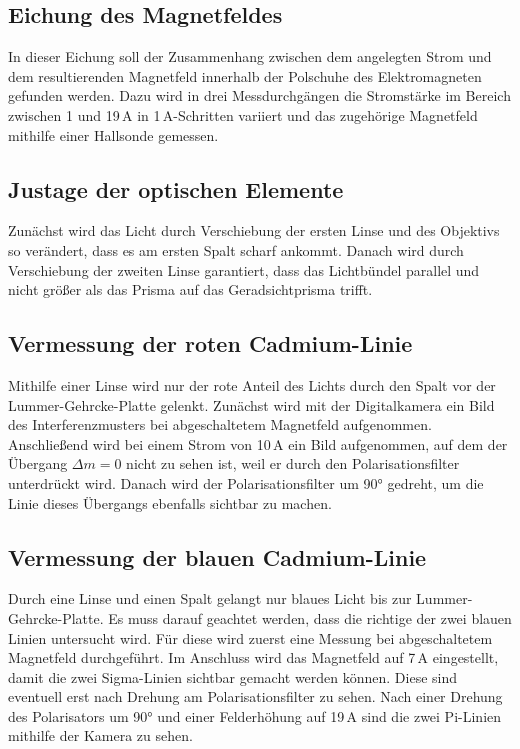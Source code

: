        \subsection{Eichung des Magnetfeldes}

            In dieser Eichung soll der Zusammenhang zwischen dem angelegten Strom und 
            dem resultierenden Magnetfeld innerhalb der Polschuhe des Elektromagneten 
            gefunden werden. Dazu wird in drei Messdurchgängen 
            die Stromstärke im Bereich zwischen 1 und 19\,A in 1\,A-Schritten variiert
            und das zugehörige Magnetfeld mithilfe einer Hallsonde gemessen.

        \subsection{Justage der optischen Elemente}

            Zunächst wird das Licht durch Verschiebung der ersten Linse und des Objektivs 
            so verändert, dass es am ersten Spalt scharf ankommt. Danach wird durch Verschiebung 
            der zweiten Linse garantiert, dass das Lichtbündel parallel und nicht größer als 
            das Prisma auf das Geradsichtprisma trifft.

        \subsection{Vermessung der roten Cadmium-Linie}

            Mithilfe einer Linse wird nur der rote Anteil des Lichts durch den Spalt 
            vor der Lummer-Gehrcke-Platte gelenkt. Zunächst wird mit der Digitalkamera 
            ein Bild des Interferenzmusters bei abgeschaltetem Magnetfeld aufgenommen. 
            Anschließend wird bei einem Strom von 10\,A ein Bild aufgenommen, auf dem
            der Übergang $\Delta m = 0$ nicht zu sehen ist, weil er durch den Polarisationsfilter 
            unterdrückt wird. Danach wird der Polarisationsfilter um 90° gedreht, um die Linie 
            dieses Übergangs ebenfalls sichtbar zu machen.

        \subsection{Vermessung der blauen Cadmium-Linie}

            Durch eine Linse und einen Spalt gelangt nur blaues Licht bis zur Lummer-Gehrcke-Platte. 
            Es muss darauf geachtet werden, dass die richtige der zwei blauen Linien untersucht wird. 
            Für diese wird zuerst eine Messung bei abgeschaltetem Magnetfeld durchgeführt. 
            Im Anschluss wird das Magnetfeld auf 7\,A eingestellt, damit die zwei Sigma-Linien 
            sichtbar gemacht werden können. Diese sind eventuell erst nach Drehung am Polarisationsfilter
            zu sehen. Nach einer Drehung des Polarisators um 90° und einer Felderhöhung auf 
            19\,A sind die zwei Pi-Linien mithilfe der Kamera zu sehen.


